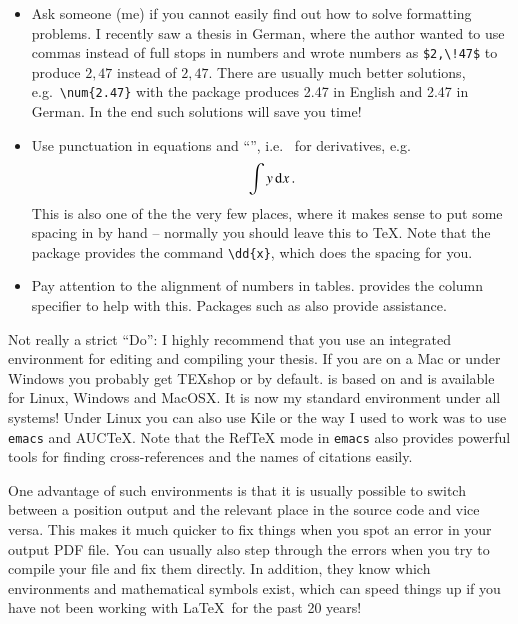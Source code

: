 \begin{itemize}
\item Ask someone (me) if you cannot easily find out how to solve
  formatting problems. I recently saw a thesis in German, where the
  author wanted to use commas instead of full stops in numbers and
  wrote numbers as \verb+$2,\!47$+ to produce $2,\!47$ instead of
  $2,47$. There are usually much better solutions, e.g.\
  \verb+\num{2.47}+ with the  package produces
  \num{2.47} in English and \foreignlanguage{ngerman}{\num{2.47}} in
  German. In the end such solutions will save you time!
\item Use punctuation in equations and \enquote{\dif}, i.e.\  for
  derivatives,\index{derivative} e.g.
  \begin{equation*}
    \int y\, \text{d} x\,.
  \end{equation*}
  This is also one of the the very few places, where it makes sense
  to put some spacing in by hand -- normally you should leave this to \TeX.
  Note that the \Package{physics} package provides the command \verb|\dd{x}|,
  which does the spacing for you.
\item Pay attention to the alignment of numbers in
  tables.  provides the  column specifier to
  help with this. Packages such as \Package{dcolumn} also provide assistance.
\end{itemize}

Not really a strict \enquote{Do}: I highly recommend that you use an
integrated environment for editing and compiling your thesis.
If you are on a Mac or under Windows you probably get TEXshop or
\TeXLive by default. 
\TeXstudio is based on \TeXmaker and is available for Linux,
Windows and MacOSX. It is now my standard environment under all systems!
Under Linux you can also use Kile\index{kile} or the way I used to work
was to use \texttt{emacs}\index{emacs} and AUCTeX.
Note that the RefTeX mode in \texttt{emacs} also provides powerful
tools for finding cross-references and the names of citations easily.

One advantage of such environments is that it is usually
possible to switch between a position output and the relevant place in
the source code and vice versa. This makes it much quicker to fix
things when you spot an error in your output PDF file. You can usually
also step through the errors when you try to compile your file and fix
them directly. In addition, they know which environments and
mathematical symbols exist, which can speed things up if you have not
been working with \LaTeX\ for the past 20 years!

